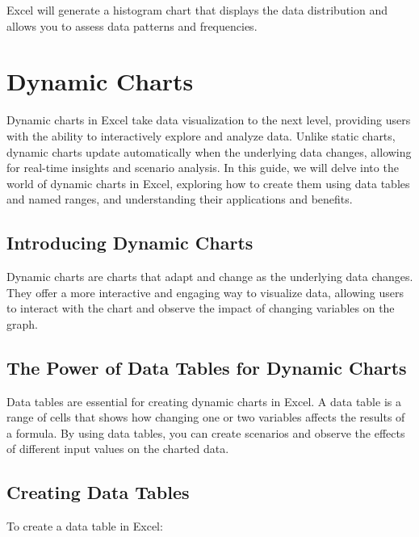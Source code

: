 \documentclass[
]{book}
\begin{document}
Excel will generate a histogram chart that displays the data distribution and allows you to assess data patterns and frequencies.

\hypertarget{dynamic-charts}{%
\section{Dynamic Charts}\label{dynamic-charts}}

Dynamic charts in Excel take data visualization to the next level, providing users with the ability to interactively explore and analyze data. Unlike static charts, dynamic charts update automatically when the underlying data changes, allowing for real-time insights and scenario analysis. In this guide, we will delve into the world of dynamic charts in Excel, exploring how to create them using data tables and named ranges, and understanding their applications and benefits.

\hypertarget{introducing-dynamic-charts}{%
\subsection{Introducing Dynamic Charts}\label{introducing-dynamic-charts}}

Dynamic charts are charts that adapt and change as the underlying data changes. They offer a more interactive and engaging way to visualize data, allowing users to interact with the chart and observe the impact of changing variables on the graph.

\hypertarget{the-power-of-data-tables-for-dynamic-charts}{%
\subsection{The Power of Data Tables for Dynamic Charts}\label{the-power-of-data-tables-for-dynamic-charts}}

Data tables are essential for creating dynamic charts in Excel. A data table is a range of cells that shows how changing one or two variables affects the results of a formula. By using data tables, you can create scenarios and observe the effects of different input values on the charted data.

\hypertarget{creating-data-tables}{%
\subsection{Creating Data Tables}\label{creating-data-tables}}

To create a data table in Excel:
\end{document}
